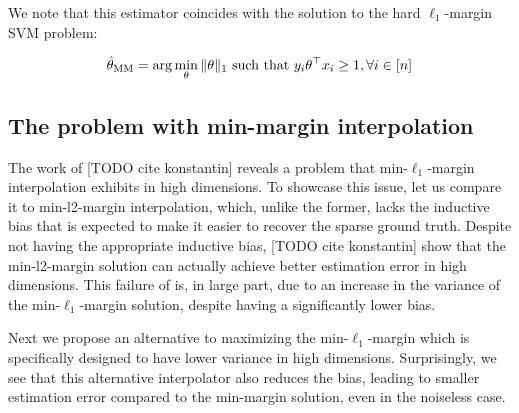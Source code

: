 We note that this estimator coincides with the solution to the hard
$\ell_1$-margin SVM problem:

\begin{align}
  \hat{\theta}_{\mathrm{MM}} = \arg\min_{\theta} \|\theta\|_1 \text{ such that } y_i\theta^\top x_i \ge 1, \forall i \in
  [n]
\end{align}

\subsection{The problem with min-margin interpolation}

The work of [TODO cite konstantin] reveals a problem that min-$\ell_1$-margin
interpolation exhibits in high dimensions.  To showcase this issue, let us
compare it to min-l2-margin interpolation, which, unlike the former, lacks the
inductive bias that is expected to make it easier to recover the sparse ground
truth. Despite not having the appropriate inductive bias, [TODO cite konstantin]
show that the min-l2-margin solution can actually achieve better estimation
error in high dimensions. 
This failure of is, in large part, due to an increase in the variance of the
min-$\ell_1$-margin solution, despite having a significantly lower bias.

Next we propose an alternative to maximizing the min-$\ell_1$-margin which is
specifically designed to have lower variance in high dimensions.  Surprisingly,
we see that this alternative interpolator also reduces the bias, leading to
smaller estimation error compared to the min-margin solution, even in the
noiseless case.


